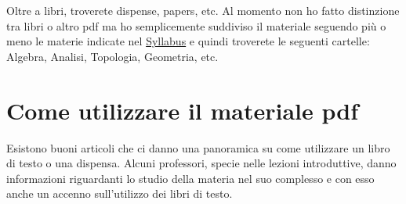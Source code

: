 Oltre a libri, troverete dispense, papers, etc. Al momento non ho fatto distinzione tra libri o altro pdf ma ho semplicemente suddiviso il materiale seguendo
più o meno le materie indicate nel \href{Syllabus.html}{Syllabus} e quindi troverete le seguenti cartelle: Algebra, Analisi, Topologia, Geometria, etc.

\section*{Come utilizzare il materiale pdf}
Esistono buoni articoli che ci danno una panoramica su come utilizzare un libro di testo o una dispensa. Alcuni professori, specie nelle lezioni introduttive, danno
informazioni riguardanti lo studio della materia nel suo complesso e con esso anche un accenno sull'utilizzo dei libri di testo.

